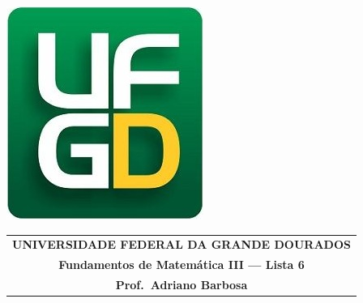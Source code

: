 \documentclass[a4paper,5pt]{amsbook}
\begin{document}
\thispagestyle{empty}
\pagestyle{empty}
\begin{minipage}[h]{0.14\textwidth}
	\includegraphics[scale=0.24]{../ufgd.png}
\end{minipage}
\begin{minipage}[h]{\textwidth}
\begin{tabular}{c}
{{\bf UNIVERSIDADE FEDERAL DA GRANDE DOURADOS}}\\
{{\bf Fundamentos de Matem\'{a}tica III --- Lista 6}}\\
{{\bf Prof.\ Adriano Barbosa}}\\
\end{tabular}
\vspace{-0.45cm}
%
\end{minipage}

\end{document}
